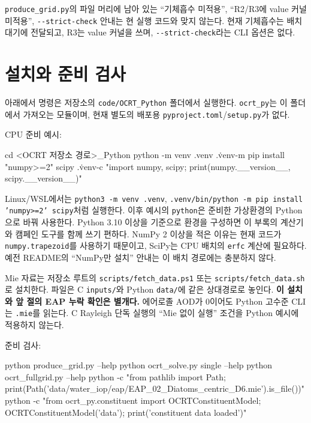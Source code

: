\texttt{produce\_\allowbreak{}grid.\allowbreak{}py}의 파일 머리에 남아 있는 “기체흡수 미적용”, “R2/R3에 value 커널 미적용”, \texttt{-\allowbreak{}-\allowbreak{}strict-\allowbreak{}check} 안내는 현 실행 코드와 맞지 않는다. 현재 기체흡수는 배치 대기에 전달되고, R3는 value 커널을 쓰며, \texttt{-\allowbreak{}-\allowbreak{}strict-\allowbreak{}check}라는 CLI 옵션은 없다.

\section{설치와 준비 검사}
\label{sec:auto:06_python_batch:2}
아래에서 명령은 저장소의 \texttt{code/\allowbreak{}OCRT\_\allowbreak{}Python} 폴더에서 실행한다. \texttt{ocrt\_\allowbreak{}py}는 이 폴더에서 가져오는 모듈이며, 현재 별도의 배포용 \texttt{pyproject.\allowbreak{}toml}/\texttt{setup.\allowbreak{}py}가 없다.

CPU 준비 예시:


\begin{ManualCode}
cd <OCRT 저장소 경로>\code\OCRT_Python
python -m venv .venv
.\.venv\Scripts\python -m pip install "numpy>=2" scipy
.\.venv\Scripts\python -c "import numpy, scipy; print(numpy.__version__, scipy.__version__)"
\end{ManualCode}

Linux/WSL에서는 \texttt{python3 -\allowbreak{}m venv .\allowbreak{}venv}, \texttt{.\allowbreak{}venv/\allowbreak{}bin/\allowbreak{}python -\allowbreak{}m pip install 'n\allowbreak{}umpy>=\allowbreak{}2' scipy}처럼 실행한다. 이후 예시의 \texttt{python}은 준비한 가상환경의 Python으로 바꿔 사용한다. Python 3.10 이상을 기준으로 환경을 구성하면 이 부록의 계산기와 캠페인 도구를 함께 쓰기 편하다. NumPy 2 이상을 적은 이유는 현재 코드가 \texttt{numpy.\allowbreak{}trapezoid}를 사용하기 때문이고, SciPy는 CPU 배치의 \texttt{erfc} 계산에 필요하다. 예전 README의 “NumPy만 설치” 안내는 이 배치 경로에는 충분하지 않다.

Mie 자료는 저장소 루트의 \texttt{scripts/\allowbreak{}fetch\_\allowbreak{}data.\allowbreak{}ps1} 또는 \texttt{scripts/\allowbreak{}fetch\_\allowbreak{}data.\allowbreak{}sh}로 설치한다. 파일은 C \texttt{inputs/\allowbreak{}}와 Python \texttt{data/\allowbreak{}}에 같은 상대경로로 놓인다. \textbf{이 설치와 앞 절의 EAP 누락 확인은 별개다.} 에어로졸 AOD가 0이어도 Python 고수준 CLI는 \texttt{.\allowbreak{}mie}를 읽는다. C Rayleigh 단독 실행의 “Mie 없이 실행” 조건을 Python 예시에 적용하지 않는다.

준비 검사:


\begin{ManualCode}
python produce_grid.py --help
python ocrt_solve.py single --help
python ocrt_fullgrid.py --help
python -c "from pathlib import Path; print(Path('data/water_iop/eap/EAP_02_Diatoms_centric_D6.mie').is_file())"
python -c "from ocrt_py.constituent import OCRTConstituentModel; OCRTConstituentModel('data'); print('constituent data loaded')"
\end{ManualCode}

